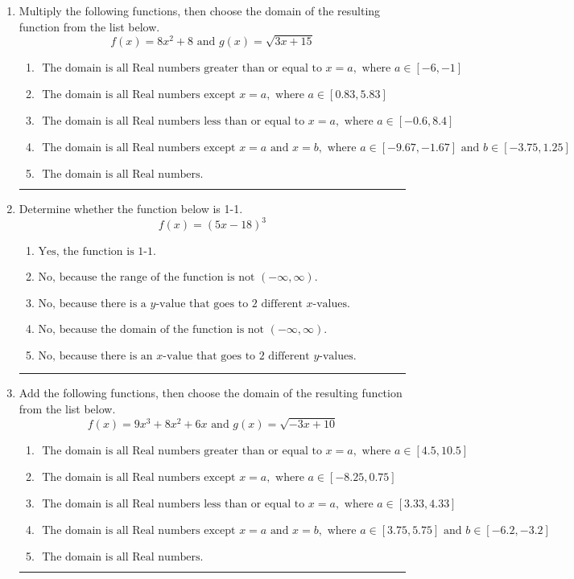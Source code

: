 \documentclass[14pt]{extbook}
\newcommand{\litem}[1]{\item#1\hspace*{-1cm}\rule{\textwidth}{0.4pt}}
\begin{document}
\begin{enumerate}
{\begin{enumerate}[label=\Alph*.]
\end{enumerate} }
\litem{
Multiply the following functions, then choose the domain of the resulting function from the list below.\[ f(x) = 8x^{2} + 8 \text{ and } g(x) = \sqrt{3x+15}  \]\begin{enumerate}[label=\Alph*.]
\item \( \text{ The domain is all Real numbers greater than or equal to } x = a, \text{ where } a \in [-6, -1] \)
\item \( \text{ The domain is all Real numbers except } x = a, \text{ where } a \in [0.83, 5.83] \)
\item \( \text{ The domain is all Real numbers less than or equal to } x = a, \text{ where } a \in [-0.6, 8.4] \)
\item \( \text{ The domain is all Real numbers except } x = a \text{ and } x = b, \text{ where } a \in [-9.67, -1.67] \text{ and } b \in [-3.75, 1.25] \)
\item \( \text{ The domain is all Real numbers. } \)

\end{enumerate} }
\litem{
Determine whether the function below is 1-1.\[ f(x) = (5 x - 18)^3 \]\begin{enumerate}[label=\Alph*.]
\item \( \text{Yes, the function is 1-1.} \)
\item \( \text{No, because the range of the function is not $(-\infty, \infty)$.} \)
\item \( \text{No, because there is a $y$-value that goes to 2 different $x$-values.} \)
\item \( \text{No, because the domain of the function is not $(-\infty, \infty)$.} \)
\item \( \text{No, because there is an $x$-value that goes to 2 different $y$-values.} \)

\end{enumerate} }
\litem{
Add the following functions, then choose the domain of the resulting function from the list below.\[ f(x) = 9x^{3} +8 x^{2} +6 x \text{ and } g(x) = \sqrt{-3x+10}  \]\begin{enumerate}[label=\Alph*.]
\item \( \text{ The domain is all Real numbers greater than or equal to } x = a, \text{ where } a \in [4.5, 10.5] \)
\item \( \text{ The domain is all Real numbers except } x = a, \text{ where } a \in [-8.25, 0.75] \)
\item \( \text{ The domain is all Real numbers less than or equal to } x = a, \text{ where } a \in [3.33, 4.33] \)
\item \( \text{ The domain is all Real numbers except } x = a \text{ and } x = b, \text{ where } a \in [3.75, 5.75] \text{ and } b \in [-6.2, -3.2] \)
\item \( \text{ The domain is all Real numbers. } \)

\end{enumerate} }
\end{enumerate}
\end{document}
